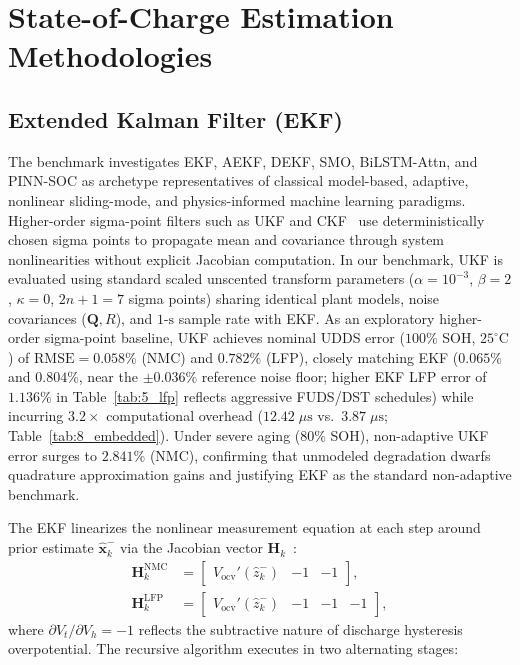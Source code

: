 \documentclass[preprint,12pt]{elsarticle}
\begin{document}
\section{State-of-Charge Estimation Methodologies}

\subsection{Extended Kalman Filter (EKF)}
The benchmark investigates EKF, AEKF, DEKF, SMO, BiLSTM-Attn, and PINN-SOC as archetype representatives of classical model-based, adaptive, nonlinear sliding-mode, and physics-informed machine learning paradigms. Higher-order sigma-point filters such as UKF and CKF~\cite{Plett2006ukf,He2013ukf} use deterministically chosen sigma points to propagate mean and covariance through system nonlinearities without explicit Jacobian computation. In our benchmark, UKF is evaluated using standard scaled unscented transform parameters ($\alpha = 10^{-3}$, $\beta = 2$, $\kappa = 0$, $2n+1=7$ sigma points) sharing identical plant models, noise covariances ($\mathbf{Q}, R$), and $1\text{-s}$ sample rate with EKF. As an exploratory higher-order sigma-point baseline, UKF achieves nominal UDDS error ($100\%$ SOH, $25^\circ\text{C}$) of $\text{RMSE} = 0.058\%$ (NMC) and $0.782\%$ (LFP), closely matching EKF ($0.065\%$ and $0.804\%$, near the $\pm 0.036\%$ reference noise floor; higher EKF LFP error of $1.136\%$ in Table~\ref{tab:5_lfp} reflects aggressive FUDS/DST schedules) while incurring $3.2\times$ computational overhead ($12.42\;\mu\text{s}$ vs.\ $3.87\;\mu\text{s}$; Table~\ref{tab:8_embedded}). Under severe aging ($80\%$ SOH), non-adaptive UKF error surges to $2.841\%$ (NMC), confirming that unmodeled degradation dwarfs quadrature approximation gains and justifying EKF as the standard non-adaptive benchmark.

The EKF linearizes the nonlinear measurement equation at each step around prior estimate $\hat{\mathbf{x}}_k^-$ via the Jacobian vector $\mathbf{H}_k$~\cite{Plett2004part3}:
\begin{align}\label{eqn:ekf_jacobian}
\mathbf{H}_k^{\text{NMC}} &= \begin{bmatrix} V_{\text{ocv}}'(\hat{z}_k^-) & -1 & -1 \end{bmatrix}, \nonumber\\
\mathbf{H}_k^{\text{LFP}} &= \begin{bmatrix} V_{\text{ocv}}'(\hat{z}_k^-) & -1 & -1 & -1 \end{bmatrix},
\end{align}
where $\partial V_t / \partial V_h = -1$ reflects the subtractive nature of discharge hysteresis overpotential. The recursive algorithm executes in two alternating stages:
\end{document}
